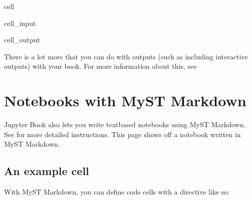 \documentclass[letterpaper,10pt,english]{jupyterBook}
\begin{document}
\begin{sphinxuseclass}{cell}
\begin{sphinxVerbatimInput}
\begin{sphinxuseclass}{cell_input}
\begin{sphinxVerbatim}[commandchars=\\\{\}]
    
  
 \PYG{p}{[}  \PYG{p}{]}
\end{sphinxVerbatim}

\end{sphinxuseclass}\end{sphinxVerbatimInput}
\begin{sphinxVerbatimOutput}

\begin{sphinxuseclass}{cell_output}
\noindent{}

\end{sphinxuseclass}\end{sphinxVerbatimOutput}

\end{sphinxuseclass}
\sphinxAtStartPar
There is a lot more that you can do with outputs (such as including interactive outputs)
with your book. For more information about this, see 


\chapter{Notebooks with MyST Markdown}
\label{\detokenize{markdown-notebooks:notebooks-with-myst-markdown}}\label{\detokenize{markdown-notebooks::doc}}
\sphinxAtStartPar
Jupyter Book also lets you write text\sphinxhyphen{}based notebooks using MyST Markdown.
See  for more detailed instructions.
This page shows off a notebook written in MyST Markdown.


\section{An example cell}
\label{\detokenize{markdown-notebooks:an-example-cell}}
\sphinxAtStartPar
With MyST Markdown, you can define code cells with a directive like so:
\end{document}
